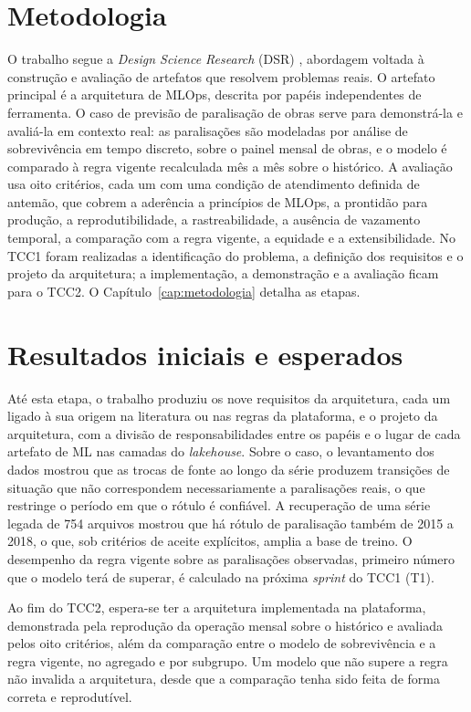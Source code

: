 \section{Metodologia}

O trabalho segue a \textit{Design Science Research} (DSR) \cite{hevner2004,peffers2007}, abordagem voltada à construção e avaliação de artefatos que resolvem problemas reais. O artefato principal é a arquitetura de MLOps, descrita por papéis independentes de ferramenta. O caso de previsão de paralisação de obras serve para demonstrá-la e avaliá-la em contexto real: as paralisações são modeladas por análise de sobrevivência em tempo discreto, sobre o painel mensal de obras, e o modelo é comparado à regra vigente recalculada mês a mês sobre o histórico. A avaliação usa oito critérios, cada um com uma condição de atendimento definida de antemão, que cobrem a aderência a princípios de MLOps, a prontidão para produção, a reprodutibilidade, a rastreabilidade, a ausência de vazamento temporal, a comparação com a regra vigente, a equidade e a extensibilidade. No TCC1 foram realizadas a identificação do problema, a definição dos requisitos e o projeto da arquitetura; a implementação, a demonstração e a avaliação ficam para o TCC2. O Capítulo~\ref{cap:metodologia} detalha as etapas.

\section{Resultados iniciais e esperados}

Até esta etapa, o trabalho produziu os nove requisitos da arquitetura, cada um ligado à sua origem na literatura ou nas regras da plataforma, e o projeto da arquitetura, com a divisão de responsabilidades entre os papéis e o lugar de cada artefato de ML nas camadas do \textit{lakehouse}. Sobre o caso, o levantamento dos dados mostrou que as trocas de fonte ao longo da série produzem transições de situação que não correspondem necessariamente a paralisações reais, o que restringe o período em que o rótulo é confiável. A recuperação de uma série legada de 754 arquivos mostrou que há rótulo de paralisação também de 2015 a 2018, o que, sob critérios de aceite explícitos, amplia a base de treino. O desempenho da regra vigente sobre as paralisações observadas, primeiro número que o modelo terá de superar, é calculado na próxima \textit{sprint} do TCC1 (T1).

Ao fim do TCC2, espera-se ter a arquitetura implementada na plataforma, demonstrada pela reprodução da operação mensal sobre o histórico e avaliada pelos oito critérios, além da comparação entre o modelo de sobrevivência e a regra vigente, no agregado e por subgrupo. Um modelo que não supere a regra não invalida a arquitetura, desde que a comparação tenha sido feita de forma correta e reprodutível.

